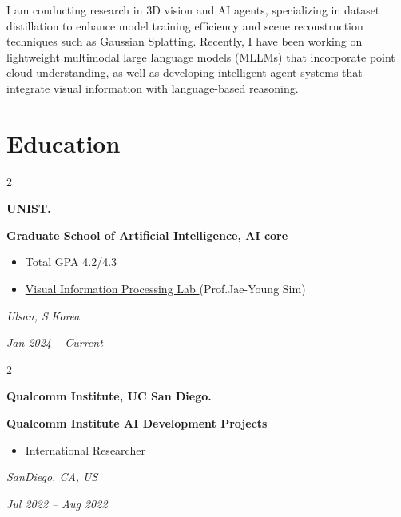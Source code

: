 \documentclass[10pt, letterpaper]{article}
\newenvironment{highlights}{
    \begin{itemize}[
        topsep=0.10 cm,
        parsep=0.10 cm,
        partopsep=0pt,
        itemsep=0pt,
        leftmargin=0.4 cm + 10pt
    ]
}{
    \end{itemize}
} %
\newenvironment{twocolentry}[2][]{
    \onecolentry
    \def\secondColumn{#2}
    \setcolumnwidth{\fill, 3.5 cm}
    \begin{paracol}{2}
}{
    \switchcolumn \raggedleft \secondColumn
    \end{paracol}
    \endonecolentry
} %
\let\hrefWithoutArrow\href
\renewcommand{\href}[2]{\hrefWithoutArrow{#1}{\ifthenelse{\equal{#2}{}}{ }{#2 }\raisebox{.15ex}{\footnotesize \faExternalLink*}}}
\begin{document}
    I am conducting research in 3D vision and AI agents, specializing in dataset distillation to enhance model training efficiency and scene reconstruction techniques such as Gaussian Splatting.
    Recently, I have been working on lightweight multimodal large language models (MLLMs) that incorporate point cloud understanding, as well as developing intelligent agent systems that integrate visual information with language-based reasoning.
    \vspace{0.2cm}


    \section{Education}
        \begin{twocolentry}{
            \small\textit{Ulsan, S.Korea}
            
            \vspace{0.2cm}
            
            \textit{Jan 2024 – Current}
        }
            \textbf{\color{headingOrange}UNIST.}
            
            \vspace{0.2cm}
            
            \textbf{Graduate School of Artificial Intelligence, AI core}
            \begin{highlights}
                \item Total GPA 4.2/4.3
                \item \hrefWithoutArrow{https://vip.unist.ac.kr/}{Visual Information Processing Lab \faLink}(Prof.Jae-Young Sim)
            \end{highlights}
        \end{twocolentry}

        \begin{twocolentry}{
            \small\textit{SanDiego, CA, US}
            
            \vspace{0.2cm}
            
            \textit{Jul 2022 – Aug 2022}
        }
            \textbf{\color{headingOrange}Qualcomm Institute, UC San Diego.}
            
            \vspace{0.2cm}
            
            \textbf{Qualcomm Institute AI Development Projects}
            \begin{highlights}
                \item International Researcher
            \end{highlights}
        \end{twocolentry}
        
\end{document}
